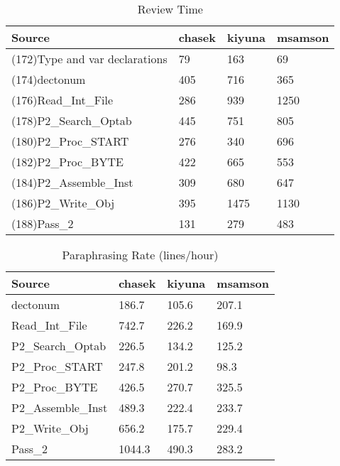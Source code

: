 \begin{table}[hb]
\begin{center}
\begin{tabular}{|l|l|l|l|}
\hline
Source & chasek & kiyuna & msamson\\
\hline
(172)Type and var declarations & 79 & 163 & 69\\
(174)dectonum & 405 & 716 & 365\\
(176)Read\_Int\_File & 286 & 939 & 1250\\
(178)P2\_Search\_Optab & 445 & 751 & 805\\
(180)P2\_Proc\_START & 276 & 340 & 696\\
(182)P2\_Proc\_BYTE & 422 & 665 & 553\\
(184)P2\_Assemble\_Inst & 309 & 680 & 647\\
(186)P2\_Write\_Obj & 395 & 1475 & 1130\\
(188)Pass\_2 & 131 & 279 & 483\\
\hline
\end{tabular}
\end{center}
\caption{Review Time}
\end{table}

\begin{table}[hb]
\begin{center}
\begin{tabular}{|l|l|l|l|}
\hline
Source & chasek & kiyuna & msamson\\
\hline
dectonum & 186.7 & 105.6 & 207.1\\
Read\_Int\_File & 742.7 & 226.2 & 169.9\\
P2\_Search\_Optab & 226.5 & 134.2 & 125.2\\
P2\_Proc\_START & 247.8 & 201.2 & 98.3\\
P2\_Proc\_BYTE & 426.5 & 270.7 & 325.5\\
P2\_Assemble\_Inst & 489.3 & 222.4 & 233.7\\
P2\_Write\_Obj & 656.2 & 175.7 & 229.4\\
Pass\_2 & 1044.3 & 490.3 & 283.2\\
\hline
\end{tabular}
\end{center}
\caption{Paraphrasing Rate (lines/hour)}
\end{table}


